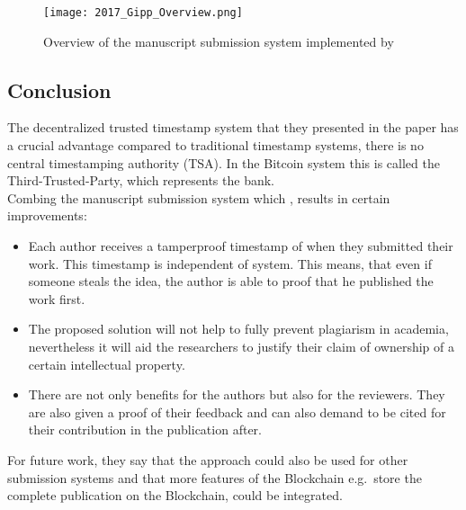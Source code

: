 \begin{figure}[!ht]
    \centering
    \texttt{[image: 2017\_Gipp\_Overview.png]}
    \label{fig:2017_gipp_overview}
    \caption{Overview of the manuscript submission system implemented by \citet{2017_Gipp}}
\end{figure}


\subsection*{Conclusion}
The decentralized trusted timestamp system  that they presented in the paper has a crucial advantage compared to traditional timestamp systems, there is no central timestamping authority (TSA). In the Bitcoin system this is called the Third-Trusted-Party, which represents the bank.\\
Combing the manuscript submission system which , results in certain improvements:
\begin{itemize}
	\item Each author receives a tamperproof timestamp of when they submitted their work. This timestamp is independent of  system. This means, that even if someone steals the idea, the author is able to proof that he published the work first.
	\item The proposed solution will not help to fully prevent plagiarism in academia, nevertheless it will aid the researchers to justify their claim of ownership of a certain intellectual property.
	\item There are not only benefits for the authors but also for the reviewers. They are also given a proof of their feedback and can also demand to be cited for their contribution in the publication after.
\end{itemize}
For future work, they say that the approach could also be used for other submission systems and that more features of the Blockchain e.g.\ store the complete publication on the Blockchain, could be integrated.\\